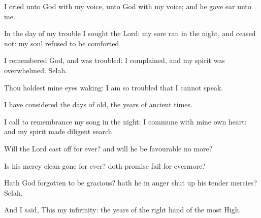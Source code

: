 {\Q {}I
cried unto
God with my
voice,
{} unto
God with my
voice; and he gave
ear unto me.


\par }{\Q {}In the
day of my
trouble I
sought the
Lord: my
sore
ran in the
night, and
ceased not: my
soul
refused to be
comforted.


\par }{\Q {}I
remembered
God, and was
troubled: I
complained, and my
spirit was
overwhelmed.
Selah.


\par }{\Q {}Thou
holdest mine
eyes
waking: I am so
troubled that I cannot
speak.


\par }{\Q {}I have
considered the
days of
old, the
years of ancient
times.


\par }{\Q {}I call to
remembrance my
song in the
night: I
commune with mine own
heart: and my
spirit made diligent
search.


\par }{\Q {}Will the
Lord cast
off for
ever? and
will he be
favourable no more?


\par }{\Q {}Is his
mercy clean
gone for
ever? doth
{}
promise
fail for
evermore?


\par }{\Q {}Hath
God
forgotten to be
gracious? hath he in
anger shut
up his tender
mercies?
Selah.


\par }{\Q {}And I
said, This
{} my
infirmity:
{} the
years of the right
hand of the most
High.


\par }{\BB \par }
